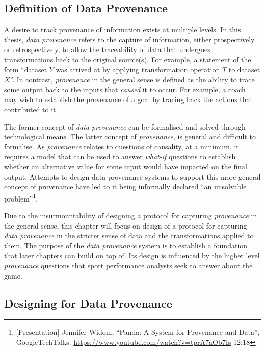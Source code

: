 \subsection{Definition of Data Provenance}

A desire to track provenance of information exists at multiple levels. In this thesis, \textit{data provenance} refers to the capture of information, either prospectively or retrospectively, to allow the traceability of data that undergoes transformations back to the original source(s). For example, a statement of the form ``dataset $Y$ was arrived at by applying transformation operation $T$ to dataset $X$''. In contrast, \textit{provenance} in the general sense is defined as the ability to trace some output back to the inputs that \textit{caused} it to occur. For example, a coach may wish to establish the provenance of a goal by tracing back the actions that contributed to it.

The former concept of \textit{data provenance} can be formalised and solved through technological means. The latter concept of \textit{provenance}, is general and difficult to formalise. As \textit{provenance} relates to questions of causality, at a minimum, it requires a model that can be used to answer \textit{what-if} questions to establish whether an alternative value for some input would have impacted on the final output. Attempts to design data provenance systems to support this more general concept of provenance have led to it being informally declared ``an unsolvable problem''\footnote{[Presentation] Jennifer Widom, ``Panda: A System for Provenance and Data'', GoogleTechTalks. \url{https://www.youtube.com/watch?v=tprA7aOb7Is} 12:18}.

Due to the insurmountability of designing a protocol for capturing \textit{provenance} in the general sense, this chapter will focus on design of a protocol for capturing \textit{data provenance} in the stricter sense of data and the transformations applied to them. The purpose of the \textit{data provenance} system is to establish a foundation that later chapters can build on top of. Its design is influenced by the higher level \textit{provenance} questions that sport performance analysts seek to answer about the game.

\subsection{Designing for Data Provenance}

